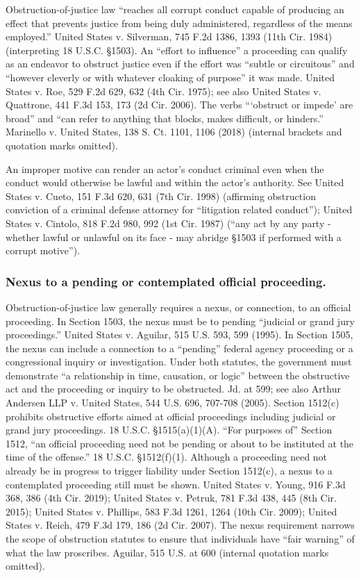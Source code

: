 Obstruction-of-justice law “reaches all corrupt conduct capable of producing an effect that prevents justice from being duly administered, regardless of the means employed.” 
United States v. Silverman, 745 F.2d 1386, 1393 (11th Cir. 1984) (interpreting 18 U.S.C. \S 1503). 
An “effort to influence” a proceeding can qualify as an endeavor to obstruct justice even if the effort was “subtle or circuitous” and “however cleverly or with whatever cloaking of purpose” it was made. 
United States v. Roe, 529 F.2d 629, 632 (4th Cir. 1975); 
see also United States v. Quattrone, 441 F.3d 153, 173 (2d Cir. 2006). 
The verbs “‘obstruct or impede’ are broad” and “can refer to anything that blocks, makes difficult, or hinders.” 
Marinello v. United States, 138 S. Ct. 1101, 1106 (2018) (internal brackets and quotation marks omitted). 

An improper motive can render an actor’s conduct criminal even when the conduct would otherwise be lawful and within the actor’s authority. 
See United States v. Cueto, 151 F.3d 620, 631 (7th Cir. 1998) (affirming obstruction conviction of a criminal defense attorney for “litigation related conduct”); United States v. Cintolo, 818 F.2d 980, 992 (1st Cir. 1987) (“any act by any party - whether lawful or unlawful on its face - may abridge \S 1503 if performed with a corrupt motive”).

\subsubsection*{Nexus to a pending or contemplated official proceeding.}

Obstruction-of-justice law generally requires a nexus, or connection, to an official proceeding. 
In Section 1503, the nexus must be to pending “judicial or grand jury proceedings.” 
United States v. Aguilar, 515 U.S. 593, 599 (1995). 
In Section 1505, the nexus can include a connection to a “pending” federal agency proceeding or a congressional inquiry or investigation. 
Under both statutes, the government must demonstrate “a relationship in time, causation, or logic” between the obstructive act and the proceeding or inquiry to be obstructed. 
Jd. at 599; see also Arthur Andersen LLP v. United States, 544 U.S. 696, 707-708 (2005). 
Section 1512(c) prohibits obstructive efforts aimed at official proceedings including judicial or grand jury proceedings. 
18 U.S.C. \S 1515(a)(1)(A). 
“For purposes of” Section 1512, “an official proceeding need not be pending or about to be instituted at the time of the offense.” 
18 U.S.C. \S 1512(f)(1). 
Although a proceeding need not already be in progress to trigger liability under Section 1512(c), a nexus to a contemplated proceeding still must be shown. 
United States v. Young, 916 F.3d 368, 386 (4th Cir. 2019); 
United States v. Petruk, 781 F.3d 438, 445 (8th Cir. 2015); 
United States v. Phillips, 583 F.3d 1261, 1264 (10th Cir. 2009); 
United States v. Reich, 479 F.3d 179, 186 (2d Cir. 2007). 
The nexus requirement narrows the scope of obstruction statutes to ensure that individuals have “fair warning” of what the law proscribes. 
Aguilar, 515 U.S. at 600 (internal quotation marks omitted). 

